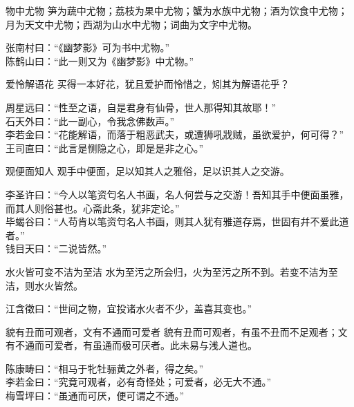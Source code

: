 \begin{yulu}{物中尤物}
笋为蔬中尤物；荔枝为果中尤物；蟹为水族中尤物；酒为饮食中尤物；月为天文中尤物；西湖为山水中尤物；词曲为文字中尤物。
\begin{comments}
张南村曰：“《幽梦影》可为书中尤物。” \\
陈鹤山曰：“此一则又为《幽梦影》中尤物。”
\end{comments}
\end{yulu}

\begin{yulu}{爱怜解语花}
买得一本好花，犹且爱护而怜惜之，矧其为解语花乎？
\begin{comments}
周星远曰：“性至之语，自是君身有仙骨，世人那得知其故耶！” \\
石天外曰：“此一副心，令我念佛数声。” \\
李若金曰：“花能解语，而落于粗恶武夫，或遭狮吼戕贼，虽欲爱护，何可得？” \\
王司直曰：“此言是恻隐之心，即是是非之心。”
\end{comments}
\end{yulu}

\begin{yulu}{观便面知人}
观手中便面，足以知其人之雅俗，足以识其人之交游。
\begin{comments}
李圣许曰：“今人以笔资匄名人书画，名人何尝与之交游！吾知其手中便面虽雅，而其人则俗甚也。心斋此条，犹非定论。” \\
毕蝎谷曰：“人苟肯以笔资匄名人书画，则其人犹有雅道存焉，世固有幷不爱此道者。” \\
钱目天曰：“二说皆然。”
\end{comments}
\end{yulu}

\begin{yulu}{水火皆可变不洁为至洁}
水为至污之所会归，火为至污之所不到。若变不洁为至洁，则水火皆然。
\begin{comments}
江含徵曰：“世间之物，宜投诸水火者不少，盖喜其变也。”
\end{comments}
\end{yulu}

\begin{yulu}{貌有丑而可观者，文有不通而可爱者}
貌有丑而可观者，有虽不丑而不足观者；文有不通而可爱者，有虽通而极可厌者。此未易与浅人道也。
\begin{comments}
陈康畴曰：“相马于牝牡骊黄之外者，得之矣。” \\
李若金曰：“究竟可观者，必有奇怪处；可爱者，必无大不通。” \\
梅雪坪曰：“虽通而可厌，便可谓之不通。”
\end{comments}
\end{yulu}

